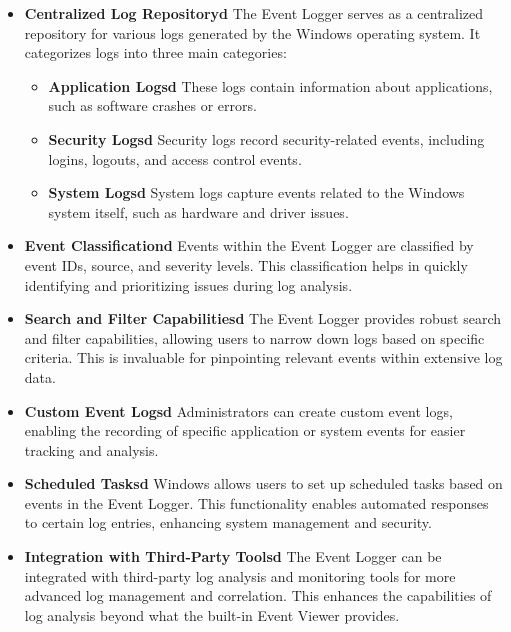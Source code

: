 \documentclass[11pt]{article}
\begin{document}
\begin{itemize}
    \item \textbf{Centralized Log Repositoryd} The Event Logger serves as a centralized repository for various logs generated by the Windows operating system. It categorizes logs into three main categories:
          \begin{itemize}
              \item \textbf{Application Logsd} These logs contain information about applications, such as software crashes or errors.
              \item \textbf{Security Logsd} Security logs record security-related events, including logins, logouts, and access control events.
              \item \textbf{System Logsd} System logs capture events related to the Windows system itself, such as hardware and driver issues.
          \end{itemize}

    \item \textbf{Event Classificationd} Events within the Event Logger are classified by event IDs, source, and severity levels. This classification helps in quickly identifying and prioritizing issues during log analysis.

    \item \textbf{Search and Filter Capabilitiesd} The Event Logger provides robust search and filter capabilities, allowing users to narrow down logs based on specific criteria. This is invaluable for pinpointing relevant events within extensive log data.

    \item \textbf{Custom Event Logsd} Administrators can create custom event logs, enabling the recording of specific application or system events for easier tracking and analysis.

    \item \textbf{Scheduled Tasksd} Windows allows users to set up scheduled tasks based on events in the Event Logger. This functionality enables automated responses to certain log entries, enhancing system management and security.

    \item \textbf{Integration with Third-Party Toolsd} The Event Logger can be integrated with third-party log analysis and monitoring tools for more advanced log management and correlation. This enhances the capabilities of log analysis beyond what the built-in Event Viewer provides.
\end{itemize}
\end{document}
